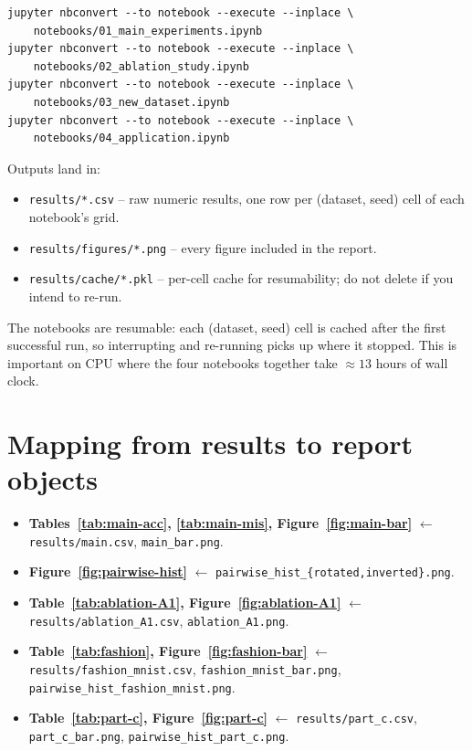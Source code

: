 \begin{verbatim}
jupyter nbconvert --to notebook --execute --inplace \
    notebooks/01_main_experiments.ipynb
jupyter nbconvert --to notebook --execute --inplace \
    notebooks/02_ablation_study.ipynb
jupyter nbconvert --to notebook --execute --inplace \
    notebooks/03_new_dataset.ipynb
jupyter nbconvert --to notebook --execute --inplace \
    notebooks/04_application.ipynb
\end{verbatim}

Outputs land in:
\begin{itemize}
    \item \texttt{results/*.csv} -- raw numeric results, one row per (dataset, seed) cell of each notebook's grid.
    \item \texttt{results/figures/*.png} -- every figure included in the report.
    \item \texttt{results/cache/*.pkl} -- per-cell cache for resumability; do not delete if you intend to re-run.
\end{itemize}

The notebooks are resumable: each (dataset, seed) cell is cached after the first successful run, so interrupting and re-running picks up where it stopped. This is important on CPU where the four notebooks together take ${\approx}13$ hours of wall clock.

\section*{Mapping from results to report objects}

\begin{itemize}
    \item \textbf{Tables~\ref{tab:main-acc}, \ref{tab:main-mis}, Figure~\ref{fig:main-bar}} $\leftarrow$ \texttt{results/main.csv}, \texttt{main\_bar.png}.
    \item \textbf{Figure~\ref{fig:pairwise-hist}} $\leftarrow$ \texttt{pairwise\_hist\_\{rotated,inverted\}.png}.
    \item \textbf{Table~\ref{tab:ablation-A1}, Figure~\ref{fig:ablation-A1}} $\leftarrow$ \texttt{results/ablation\_A1.csv}, \texttt{ablation\_A1.png}.
    \item \textbf{Table~\ref{tab:fashion}, Figure~\ref{fig:fashion-bar}} $\leftarrow$ \texttt{results/fashion\_mnist.csv}, \texttt{fashion\_mnist\_bar.png}, \texttt{pairwise\_hist\_fashion\_mnist.png}.
    \item \textbf{Table~\ref{tab:part-c}, Figure~\ref{fig:part-c}} $\leftarrow$ \texttt{results/part\_c.csv}, \texttt{part\_c\_bar.png}, \texttt{pairwise\_hist\_part\_c.png}.
\end{itemize}

